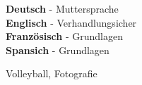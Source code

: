 \documentclass[9pt]{developercv} %
\begin{document}
\begin{minipage}[t]{0.3\textwidth}
	\vspace{-\baselineskip} %


	\textbf{Deutsch} - Muttersprache\\
	\textbf{Englisch} - Verhandlungsicher\\
  \textbf{Französisch} - Grundlagen\\
  \textbf{Spansich} - Grundlagen
\end{minipage}
\hfill
\begin{minipage}[t]{0.3\textwidth}
	\vspace{-\baselineskip} %


	Volleyball, Fotografie
\end{minipage}
\hfill
\begin{minipage}[t]{0.3\textwidth}
	\vspace{-\baselineskip} %


	\lorem
\end{minipage}

\end{document}
